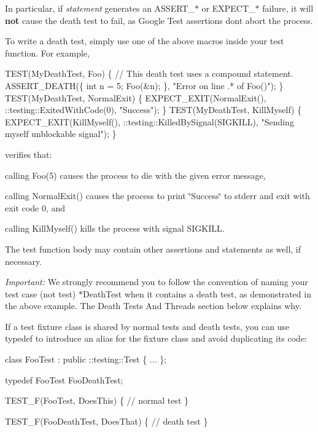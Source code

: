 In particular, if {\itshape statement} generates an {\ttfamily A\+S\+S\+E\+R\+T\+\_\+$\ast$} or {\ttfamily E\+X\+P\+E\+C\+T\+\_\+$\ast$} failure, it will {\bfseries not} cause the death test to fail, as Google Test assertions don\textquotesingle{}t abort the process.

To write a death test, simply use one of the above macros inside your test function. For example,


\begin{DoxyCode}
TEST(MyDeathTest, Foo) \{
  // This death test uses a compound statement.
  ASSERT\_DEATH(\{ int n = 5; Foo(&n); \}, "Error on line .* of Foo()");
\}
TEST(MyDeathTest, NormalExit) \{
  EXPECT\_EXIT(NormalExit(), ::testing::ExitedWithCode(0), "Success");
\}
TEST(MyDeathTest, KillMyself) \{
  EXPECT\_EXIT(KillMyself(), ::testing::KilledBySignal(SIGKILL), "Sending myself unblockable signal");
\}
\end{DoxyCode}


verifies that\+:


\begin{DoxyItemize}
\item calling {\ttfamily Foo(5)} causes the process to die with the given error message,
\item calling {\ttfamily Normal\+Exit()} causes the process to print {\ttfamily \char`\"{}\+Success\char`\"{}} to stderr and exit with exit code 0, and
\item calling {\ttfamily Kill\+Myself()} kills the process with signal {\ttfamily S\+I\+G\+K\+I\+LL}.
\end{DoxyItemize}

The test function body may contain other assertions and statements as well, if necessary.

{\itshape Important\+:} We strongly recommend you to follow the convention of naming your test case (not test) {\ttfamily $\ast$\+Death\+Test} when it contains a death test, as demonstrated in the above example. The {\ttfamily Death Tests And Threads} section below explains why.

If a test fixture class is shared by normal tests and death tests, you can use typedef to introduce an alias for the fixture class and avoid duplicating its code\+: 
\begin{DoxyCode}
class FooTest : public ::testing::Test \{ ... \};

typedef FooTest FooDeathTest;

TEST\_F(FooTest, DoesThis) \{
  // normal test
\}

TEST\_F(FooDeathTest, DoesThat) \{
  // death test
\}
\end{DoxyCode}


